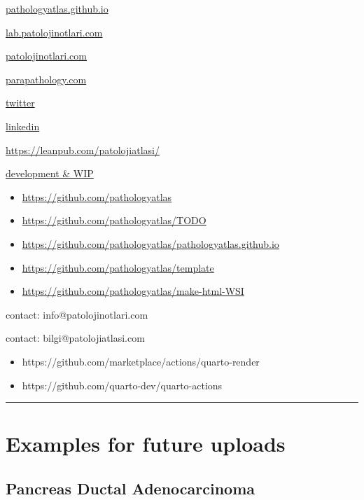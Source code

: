 \documentclass[
  letterpaper,
  DIV=11,
  numbers=noendperiod]{scrreprt}
\begin{document}
\href{https://pathologyatlas.github.io/}{pathologyatlas.github.io}

\href{https://lab.patolojinotlari.com}{lab.patolojinotlari.com}

\href{https://patolojinotlari.com}{patolojinotlari.com}

\href{https://parapathology.com}{parapathology.com}

\href{https://twitter.com/patolojinotlari}{twitter}

\href{https://www.linkedin.com/company/patoloji-notlari}{linkedin}

\url{https://leanpub.com/patolojiatlasi/}

\href{https://pathologyatlas.github.io/development.md}{development \&
WIP}

\begin{itemize}
\item
  \url{https://github.com/pathologyatlas}
\item
  \url{https://github.com/pathologyatlas/TODO}
\item
  \url{https://github.com/pathologyatlas/pathologyatlas.github.io}
\item
  \url{https://github.com/pathologyatlas/template}
\item
  \url{https://github.com/pathologyatlas/make-html-WSI}
\end{itemize}

contact: info@patolojinotlari.com

contact: bilgi@patolojiatlasi.com

\begin{itemize}
\item
  https://github.com/marketplace/actions/quarto-render
\item
  https://github.com/quarto-dev/quarto-actions
\end{itemize}

\begin{center}\rule{0.5\linewidth}{0.5pt}\end{center}

\hypertarget{examples-for-future-uploads}{%
\chapter{Examples for future
uploads}\label{examples-for-future-uploads}}

\hypertarget{pancreas-ductal-adenocarcinoma}{%
\section{Pancreas Ductal
Adenocarcinoma}\label{pancreas-ductal-adenocarcinoma}}
\end{document}
